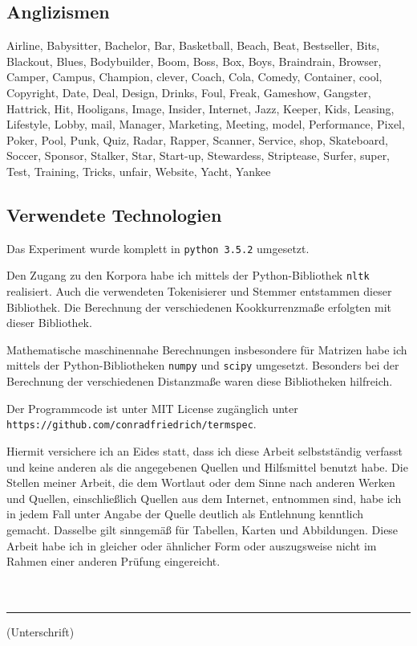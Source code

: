 \documentclass[11pt,numbers=noenddot]{scrartcl}
\begin{document}
\subsection{Anglizismen}

Airline, Babysitter, Bachelor, Bar, Basketball, Beach, Beat, Bestseller, Bits, Blackout, Blues, Bodybuilder, Boom, Boss, Box, Boys, Braindrain, Browser, Camper, Campus, Champion, clever, Coach, Cola, Comedy, Container, cool, Copyright, Date, Deal, Design, Drinks, Foul, Freak, Gameshow, Gangster, Hattrick, Hit, Hooligans, Image, Insider, Internet, Jazz, Keeper, Kids, Leasing, Lifestyle, Lobby, mail, Manager, Marketing, Meeting, model, Performance, Pixel, Poker, Pool, Punk, Quiz, Radar, Rapper, Scanner, Service, shop, Skateboard, Soccer, Sponsor, Stalker, Star, Start-up, Stewardess, Striptease, Surfer, super, Test, Training, Tricks, unfair, Website, Yacht, Yankee

\subsection{Verwendete Technologien}

Das Experiment wurde komplett in \texttt{python 3.5.2} umgesetzt.

Den Zugang zu den Korpora habe ich mittels der Python-Bibliothek \texttt{nltk} realisiert. Auch die verwendeten Tokenisierer und Stemmer entstammen dieser Bibliothek. Die Berechnung der verschiedenen Kookkurrenzmaße erfolgten mit dieser Bibliothek.

Mathematische maschinennahe Berechnungen insbesondere für Matrizen habe ich mittels der Python-Bibliotheken 
\texttt{numpy} und \texttt{scipy} umgesetzt. Besonders bei der Berechnung der verschiedenen Distanzmaße waren diese Bibliotheken hilfreich.

Der Programmcode ist unter MIT License zugänglich unter \\ \texttt{https://github.com/conradfriedrich/termspec}.


\nocite{han2011}
\nocite{heyer2008}
\nocite{manning1999}


\newpage

Hiermit versichere ich an Eides statt, dass ich diese Arbeit selbstständig verfasst
und keine anderen als die angegebenen Quellen und Hilfsmittel benutzt habe.
Die Stellen meiner Arbeit, die dem Wortlaut oder dem Sinne nach anderen
Werken und Quellen, einschließlich Quellen aus dem Internet, entnommen sind,
habe ich in jedem Fall unter Angabe der Quelle deutlich als Entlehnung kenntlich
gemacht. Dasselbe gilt sinngemäß für Tabellen, Karten und Abbildungen. Diese
Arbeit habe ich in gleicher oder ähnlicher Form oder auszugsweise nicht im
Rahmen einer anderen Prüfung eingereicht.\\\\\\

\noindent\rule{8cm}{0.4pt}
(Unterschrift)
\end{document}
